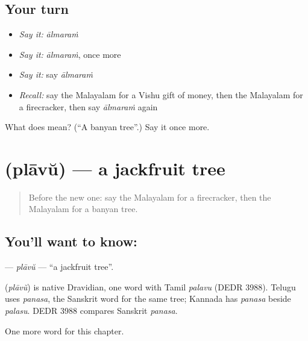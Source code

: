 \subsection*{Your turn}
\begin{itemize}
\raggedright
  \item \emph{Say it:} \emph{ālmaraṁ}
  \item \emph{Say it:} \emph{ālmaraṁ}, once more
  \item \emph{Say it:} say \emph{ālmaraṁ}
  \item \emph{Recall:} say the Malayalam for a Vishu gift of money, then the Malayalam for a firecracker, then say \emph{ālmaraṁ} again
\end{itemize}

\begin{tcolorbox}[breakable,colback=teal!4,colframe=teal!35!black,title={Before you move on}]
What does  mean? (\textquotedblleft{}A banyan tree\textquotedblright{}.) Say it once more.
\end{tcolorbox}
\section[\texorpdfstring{\ml{പ്ലാവ്} (plāvŭ)}{പ്ലാവ് (plāvŭ)}]{ (plāvŭ) — a jackfruit tree}

\label{lesson:ML-C253-plavu}



\begin{quote}
Before the new one: say the Malayalam for a firecracker, then the Malayalam for a banyan tree.
\end{quote}

\subsection*{You'll want to know: }
\textbf{} — \emph{plāvŭ} — \textquotedblleft{}a jackfruit tree\textquotedblright{}.

\begin{cousinweb}
\textbf{} (\emph{plāvŭ}) is native Dravidian, one word with Tamil \emph{palavu} (DEDR 3988). Telugu uses \emph{panasa}, the Sanskrit word for the same tree; Kannada has \emph{panasa} beside \emph{palasu}. DEDR 3988 compares Sanskrit \emph{panasa}.
\end{cousinweb}

\begin{grammarlens}[title={What you've built}]
One more word for this chapter.
\end{grammarlens}

